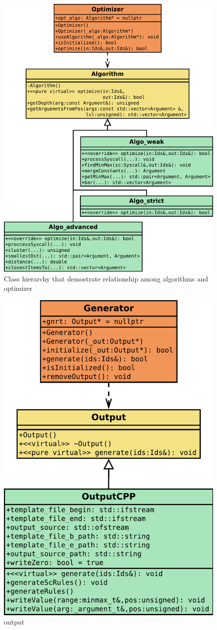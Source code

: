 \begin{figure}[H]
	\centering
	\includegraphics[width=\textwidth]{obrazky-figures/class/algo.pdf}
	\caption{Class hierarchy that demostrate relationship among algorithms and optimizer}
	\label{fig:class:algo}
\end{figure}

\begin{figure}[H]
	\centering
	\includegraphics[width=0.65\linewidth]{obrazky-figures/class/output.pdf}
	\caption{output}
	\label{fig:class:output}
\end{figure}

